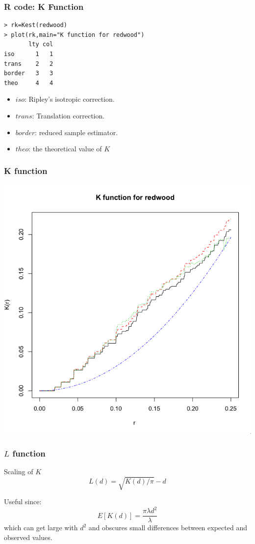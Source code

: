 \documentclass[nototal,handout]{beamer}
\begin{document}
  \begin{frame}[containsverbatim]
    \frametitle{R code: K Function}
    \begin{small}
      \begin{verbatim}
> rk=Kest(redwood)
> plot(rk,main="K function for redwood")
       lty col
iso      1   1
trans    2   2
border   3   3
theo     4   4
      \end{verbatim}
      \begin{itemize}
	\item $iso$: Ripley's isotropic correction.
	\item $trans$: Translation correction.
	\item $border$: reduced sample estimator.
	\item $theo$: the theoretical value of $K$
      \end{itemize}
    \end{small}
   \end{frame}

\begin{frame}[<+->]
    \frametitle{K function}
    \begin{center}
      \includegraphics[width=.65\linewidth]{kredwood.png}
    \end{center}
  \end{frame}
 
\begin{frame}[<+->]
    \frametitle{$L$ function}
    \begin{block}{Scaling of $K$}
      \begin{equation}
	L(d) = \sqrt{ K(d)/\pi } - d
      \end{equation}
    \end{block}
    \begin{block}{ Useful since:}
    \begin{equation}
      E[K(d)] = \frac{\pi \lambda d^2}{\lambda}
    \end{equation}
    which can get large with $d^2$ and obscures small differences between
    expected and observed values.
  \end{block}
  \end{frame}
 
\end{document}
